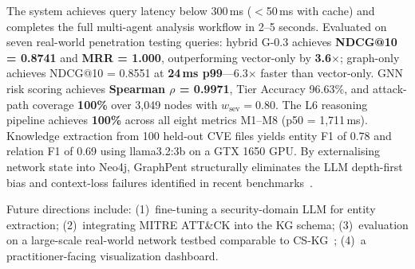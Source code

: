 \documentclass[conference]{IEEEtran}
\begin{document}
The system achieves query latency below 300\,ms ($<$50\,ms with cache) and
completes the full multi-agent analysis workflow in 2--5 seconds.
Evaluated on seven real-world penetration testing queries:
hybrid G-0.3 achieves \textbf{NDCG@10 = 0.8741} and \textbf{MRR = 1.000},
outperforming vector-only by \textbf{3.6$\times$}; graph-only achieves
NDCG@10 = 0.8551 at \textbf{24\,ms p99}---6.3$\times$ faster than
vector-only.
GNN risk scoring achieves \textbf{Spearman $\rho$ = 0.9971}, Tier Accuracy
96.63\%, and attack-path coverage \textbf{100\%} over 3,049 nodes with
$w_{\mathrm{sev}}{=}0.80$.
The L6 reasoning pipeline achieves \textbf{100\%} across all eight metrics
M1--M8 (p50 = 1,711\,ms).
Knowledge extraction from 100 held-out CVE files yields entity F1 of 0.78 and
relation F1 of 0.69 using llama3.2:3b on a GTX 1650 GPU.
By externalising network state into Neo4j, GraphPent structurally eliminates
the LLM depth-first bias and context-loss failures identified in recent
benchmarks~\cite{autopenbench2024,llmbench2024}.

Future directions include: (1)~fine-tuning a security-domain LLM for entity
extraction; (2)~integrating MITRE ATT\&CK into the KG schema; (3)~evaluation
on a large-scale real-world network testbed comparable to CS-KG~\cite{pan2025cskg};
(4)~a practitioner-facing visualization dashboard.
\end{document}
